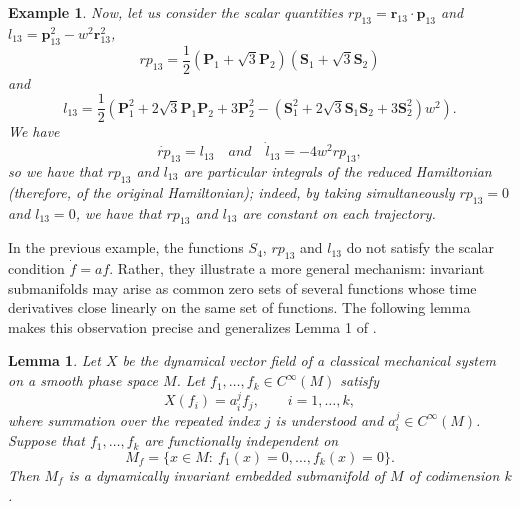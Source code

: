 \documentclass[10pt,a4paper]{article}
\newtheorem{lemma}{Lemma}
\newtheorem{example}{Example}
\begin{document}
\begin{example}
Now, let us consider the scalar quantities $rp_{13}=\textbf{r}_{13}\cdot \textbf{p}_{13}$ and $l_{13}=\textbf{p}_ {13}^{2}-w^{2}\textbf{r}_{13}^{2}$,
\begin{equation*}
rp_{13}=\frac{1}{2}(\textbf{P}_{1}+\sqrt{3}\textbf{P}_{2})(\textbf{S}_{1}+\sqrt{3}\textbf{S}_{2})
\end{equation*}
and
\begin{equation*}
l_{13}=\frac{1}{2}\left(\textbf{P}_{1}^2+2\sqrt{3}\textbf{P}_{1}\textbf{P}_{2}+3\textbf{P}_{2}^2-(\textbf{S}_{1}^2+2\sqrt{3}\textbf{S}_{1}\textbf{S}_{2}+3\textbf{S}_{2}^2)w^2\right).
\end{equation*}
We have
\begin{equation*}
\dot{rp}_{13}=l_{13}\quad\textit{and}\quad\dot{l}_{13}=-4w^{2}rp_{13},
\end{equation*}
so we have that $rp_{13}$ and $l_{13}$ are particular integrals of the reduced Hamiltonian (therefore, of the original Hamiltonian); indeed, by taking simultaneously $rp_{13}=0$ and $l_{13}=0$, we have that $rp_{13}$ and $l_{13}$ are constant on each trajectory. 
\end{example}

In the previous example, the functions $S_4$, $rp_{13}$ and $l_{13}$ do not satisfy the scalar condition $\dot f=af$. Rather, they illustrate a more general mechanism: invariant submanifolds may arise as common zero sets of several functions whose time derivatives close linearly on the same set of functions. The following lemma makes this observation precise and generalizes Lemma 1 of \cite{escobar2024particular,azuaje2025particular}.

\begin{lemma}
\label{lemma1}
Let $X$ be the dynamical vector field of a classical mechanical system on a smooth phase space $M$. Let $f_1,\ldots,f_k\in C^\infty(M)$ satisfy
\begin{equation}
\label{eqPI}
X(f_i)=a_i^j f_j,\qquad i=1,\ldots,k,
\end{equation}
where summation over the repeated index $j$ is understood and $a_i^j\in C^\infty(M)$. Suppose that $f_1,\ldots,f_k$ are functionally independent on
\begin{equation*}
\label{Mf}
M_f=\{x\in M:\ f_1(x)=0,\ldots,f_k(x)=0\}.
\end{equation*}
Then $M_f$ is a dynamically invariant embedded submanifold of $M$ of codimension $k$.
\end{lemma}
\end{document}
